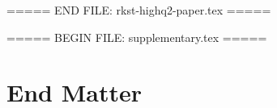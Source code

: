 \newif\ifEnableSectionTOCLinks

\EnableSectionTOCLinksfalse




\usepackage{longtable}









\renewcommand{\thefootnote}{\fnsymbol{footnote}}
\setcounter{footnote}{1}











\renewcommand{\thefootnote}{\arabic{footnote}}
\setcounter{footnote}{0}







\cleardoublepage






\pagestyle{plain}
\setcounter{page}{1}





























\newpage



===== END FILE: rkst-highq2-paper.tex =====

===== BEGIN FILE: supplementary.tex =====


\section*{End Matter}
\label{sec:end_matter}

